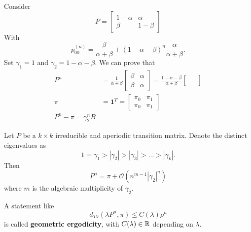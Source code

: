 \documentclass{article}
\begin{document}
\begin{example}
    Consider \[   P=\begin{bmatrix}
            1-\alpha & \alpha \\
            \beta & 1-\beta
        \end{bmatrix}\]
With
\[
p_{00}^{(n)}=\frac{\beta}{\alpha+\beta}+(1-\alpha-\beta)^n\frac{\alpha}{\alpha+\beta}.
\]
Set $\gamma_1=1$ and $\gamma_2=1-\alpha-\beta$.
We can prove that
\begin{align*}
    P^n &=\frac{1}{\alpha+\beta}\begin{bmatrix}
            \beta & \alpha \\
            \beta & \alpha
        \end{bmatrix}=\frac{1-\alpha-\beta}{\alpha+\beta}\begin{bmatrix}
           & \\
         & \\
        \end{bmatrix}\\
        \pi &=\mathbf{1}^T=\begin{bmatrix}
            \pi_0 & \pi_1 \\
            \pi_0 & \pi_1
        \end{bmatrix}\\
        P^n-\pi=\gamma_2^n B
\end{align*} %
\end{example}
\begin{theorem}
    Let $P$ be a $k\times k$ irreducible and aperiodic transition matrix. Denote the distinct eigenvalues as
        \[1=\gamma_1>|\gamma_2|>|\gamma_3|>\ldots>|\gamma_k|.\]Then
        \[P^n=\pi+
    \mathcal{O}(n^{m-1}|\gamma_2|^n)\] where $m$ is the algebraic multiplicity of $\gamma_2$.
\end{theorem}
\begin{definition}
    A statement like\[
        d_{TV}(\lambda P^n,\pi)\leqslant C(\lambda)\rho^n
        \] is called \textbf{geometric ergodicity}, with $C(\lambda)\in\mathbb{R}$ depending on $\lambda$.
\end{definition}
\end{document}

